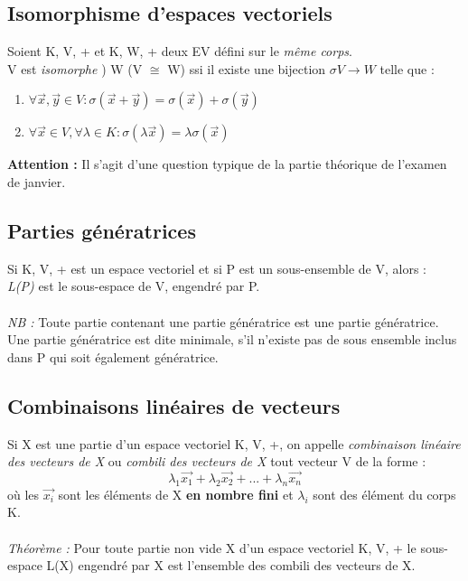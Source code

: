 \documentclass[12pt, a4paper]{article}
\begin{document}
\subsection{Isomorphisme d'espaces vectoriels}
Soient K, V, + et K, W, + deux EV défini sur le \textit{même corps}.\\
V est \textit{isomorphe} ) W (V $\cong $ W) ssi il existe une bijection $\sigma V \rightarrow W$ telle que : 
\begin{enumerate}
\item $\forall \vec{x}, \vec{y} \in V : \sigma(\vec{x} + \vec{y}) = \sigma(\vec{x}) + \sigma(\vec{y})$
\item $\forall \vec{x} \in V, \forall \lambda \in K : \sigma(\lambda\vec{x}) = \lambda\sigma(\vec{x})$
\end{enumerate}
\textbf{Attention :} Il s'agit d'une question typique de la partie théorique de l'examen de janvier.

\subsection{Parties génératrices}
Si K, V, + est un espace vectoriel et si P est un sous-ensemble de V, alors :\\
\textit{L(P)} est le sous-espace de V, engendré par P.\\\\
\textit{NB :} Toute partie contenant une partie génératrice est une partie génératrice. Une partie génératrice est dite minimale, s'il n'existe pas de sous ensemble inclus dans P qui soit également génératrice.

\subsection{Combinaisons linéaires de vecteurs}
Si X est une partie d'un espace vectoriel K, V, +, on appelle \textit{combinaison linéaire des vecteurs de X} ou \textit{combili des vecteurs de X} tout vecteur V de la forme :
$$\lambda_{1}\vec{x_{1}} + \lambda_{2}\vec{x_{2}} + ... + \lambda_{n}\vec{x_{n}}$$
où les $\vec{x_{i}}$ sont les éléments de X \textbf{en nombre fini} et $\lambda_{i}$ sont des élément du corps K.\\\\
\textit{Théorème :} Pour toute partie non vide X d'un espace vectoriel K, V, + le sous-espace L(X) engendré par X est l'ensemble des combili des vecteurs de X.
\end{document}
